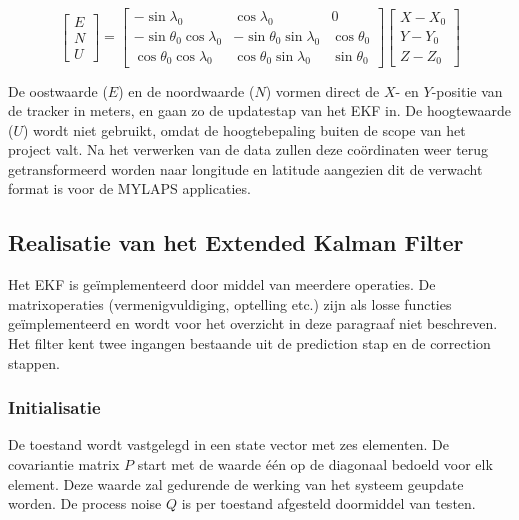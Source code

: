 \begin{equation}
    \begin{bmatrix} E \\ N \\ U \end{bmatrix}
    =
    \begin{bmatrix}
        -\sin\lambda_0 & \cos\lambda_0 & 0 \\
        -\sin\theta_0\cos\lambda_0 & -\sin\theta_0\sin\lambda_0 & \cos\theta_0 \\
        \cos\theta_0\cos\lambda_0 & \cos\theta_0\sin\lambda_0 & \sin\theta_0
    \end{bmatrix}
    \begin{bmatrix} X - X_0 \\ Y - Y_0 \\ Z - Z_0 \end{bmatrix}
    \label{eq:ecefenu}
\end{equation}

De oostwaarde ($E$) en de noordwaarde ($N$) vormen direct de $X$- en $Y$-positie van de
tracker in meters, en gaan zo de updatestap van het EKF in. De hoogtewaarde ($U$) wordt niet gebruikt, omdat de hoogtebepaling buiten de scope van het project valt. Na het verwerken van de data zullen deze coördinaten weer terug getransformeerd worden naar longitude en latitude aangezien dit de verwacht format is voor de MYLAPS applicaties. \\




\subsection{Realisatie van het Extended Kalman Filter}
\label{subsec:ekf_realisatie}

Het EKF is geïmplementeerd door middel van meerdere operaties. De matrixoperaties (vermenigvuldiging, optelling etc.) zijn als losse functies geïmplementeerd en wordt voor het overzicht in deze paragraaf niet beschreven. Het filter kent twee ingangen bestaande uit de prediction stap en de correction stappen. 

\subsubsection{Initialisatie}

De toestand wordt vastgelegd in een state vector met zes elementen. De covariantie matrix $P$ start met de waarde één op de diagonaal bedoeld voor elk element. Deze waarde zal gedurende de werking van het systeem geupdate worden. De process noise $Q$ is per toestand afgesteld doormiddel van testen.

